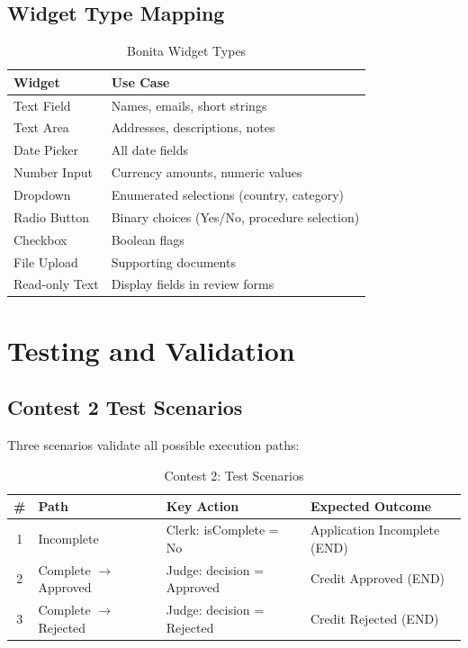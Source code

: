\documentclass[12pt,a4paper]{article}
\begin{document}
\subsection{Widget Type Mapping}

\begin{table}[H]
\centering
\caption{Bonita Widget Types}
\begin{tabular}{ll}
\toprule
\textbf{Widget} & \textbf{Use Case} \\
\midrule
Text Field & Names, emails, short strings \\
Text Area & Addresses, descriptions, notes \\
Date Picker & All date fields \\
Number Input & Currency amounts, numeric values \\
Dropdown & Enumerated selections (country, category) \\
Radio Button & Binary choices (Yes/No, procedure selection) \\
Checkbox & Boolean flags \\
File Upload & Supporting documents \\
Read-only Text & Display fields in review forms \\
\bottomrule
\end{tabular}
\label{tab:widgets}
\end{table}

\section{Testing and Validation}

\subsection{Contest 2 Test Scenarios}

Three scenarios validate all possible execution paths:

\begin{table}[H]
\centering
\caption{Contest 2: Test Scenarios}
\begin{tabular}{clll}
\toprule
\textbf{\#} & \textbf{Path} & \textbf{Key Action} & \textbf{Expected Outcome} \\
\midrule
1 & Incomplete & Clerk: isComplete = No & Application Incomplete (END) \\
2 & Complete $\rightarrow$ Approved & Judge: decision = Approved & Credit Approved (END) \\
3 & Complete $\rightarrow$ Rejected & Judge: decision = Rejected & Credit Rejected (END) \\
\bottomrule
\end{tabular}
\label{tab:contest2_tests}
\end{table}
\end{document}
